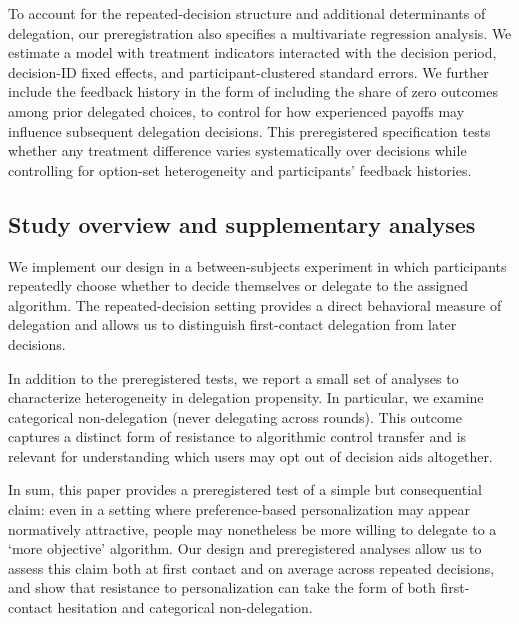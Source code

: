 \documentclass[a4paper, 12pt, fleqn]{article}
\theoremstyle{definition}
\begin{document}
To account for the repeated-decision structure and additional determinants of delegation, our preregistration also specifies a multivariate regression analysis. We estimate a model with treatment indicators interacted with the decision period, decision-ID fixed effects, and participant-clustered standard errors. We further include the feedback history in the form of including the share of zero outcomes among prior delegated choices, to control for how experienced payoffs may influence subsequent delegation decisions. This preregistered specification tests whether any treatment difference varies systematically over decisions while controlling for option-set heterogeneity and participants' feedback histories.

\subsection*{Study overview and supplementary analyses}
We implement our design in a between-subjects experiment in which participants repeatedly choose whether to decide themselves or delegate to the assigned algorithm. The repeated-decision setting provides a direct behavioral measure of delegation and allows us to distinguish first-contact delegation from later decisions.

In addition to the preregistered tests, we report a small set of analyses to characterize heterogeneity in delegation propensity. In particular, we examine categorical non-delegation (never delegating across rounds). This outcome captures a distinct form of resistance to algorithmic control transfer and is relevant for understanding which users may opt out of decision aids altogether.

In sum, this paper provides a preregistered test of a simple but consequential claim: even in a setting where preference-based personalization may appear normatively attractive, people may nonetheless be more willing to delegate to a `more objective' algorithm. Our design and preregistered analyses allow us to assess this claim both at first contact and on average across repeated decisions, and show that resistance to personalization can take the form of both first-contact hesitation and categorical non-delegation.
\end{document}
